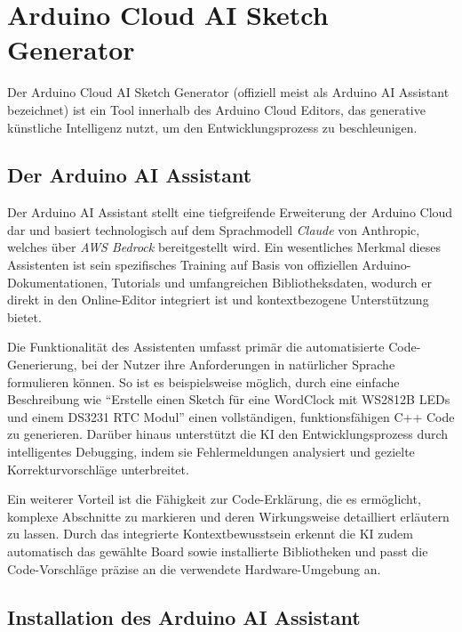 %
%
%


\chapter{Arduino Cloud AI Sketch Generator}

Der Arduino Cloud AI Sketch Generator (offiziell meist als Arduino AI Assistant bezeichnet) ist ein Tool innerhalb des Arduino Cloud Editors, das generative künstliche Intelligenz nutzt, um den Entwicklungsprozess zu beschleunigen.

\section{Der Arduino AI Assistant}

Der Arduino AI Assistant stellt eine tiefgreifende Erweiterung der Arduino Cloud dar und basiert technologisch auf dem Sprachmodell \textit{Claude} von Anthropic, welches über \textit{AWS Bedrock} bereitgestellt wird. Ein wesentliches Merkmal dieses Assistenten ist sein spezifisches Training auf Basis von offiziellen Arduino-Dokumentationen, Tutorials und umfangreichen Bibliotheksdaten, wodurch er direkt in den Online-Editor integriert ist und kontextbezogene Unterstützung bietet.

Die Funktionalität des Assistenten umfasst primär die automatisierte Code-Generierung, bei der Nutzer ihre Anforderungen in natürlicher Sprache formulieren können. So ist es beispielsweise möglich, durch eine einfache Beschreibung wie \enquote{Erstelle einen Sketch für eine WordClock mit WS2812B LEDs und einem DS3231 RTC Modul} einen vollständigen, funktionsfähigen C++ Code zu generieren. Darüber hinaus unterstützt die KI den Entwicklungsprozess durch intelligentes Debugging, indem sie Fehlermeldungen analysiert und gezielte Korrekturvorschläge unterbreitet. 

Ein weiterer Vorteil ist die Fähigkeit zur Code-Erklärung, die es ermöglicht, komplexe Abschnitte zu markieren und deren Wirkungsweise detailliert erläutern zu lassen. Durch das integrierte Kontextbewusstsein erkennt die KI zudem automatisch das gewählte Board sowie installierte Bibliotheken und passt die Code-Vorschläge präzise an die verwendete Hardware-Umgebung an.
\section{Installation des Arduino AI Assistant}